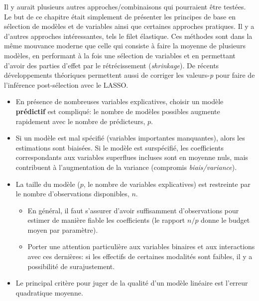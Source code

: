 \documentclass[
  11pt,
  letterpaper,
]{scrbook}
\providecommand{\tightlist}{%
  \setlength{\itemsep}{0pt}\setlength{\parskip}{0pt}}\usepackage{longtable,booktabs,array}
\theoremstyle{definition}
\theoremstyle{remark}
\begin{document}
Il y aurait plusieurs autres approches/combinaisons qui pourraient être
testées. Le but de ce chapitre était simplement de présenter les
principes de base en sélection de modèles et de variables ainsi que
certaines approches pratiques. Il y a d'autres approches intéressantes,
tels le filet élastique. Ces méthodes sont dans la même mouvance moderne
que celle qui consiste à faire la moyenne de plusieurs modèles, en
performant à la fois une sélection de variables et en permettant d'avoir
des parties d'effet par le rétrécissement (\emph{shrinkage}). De récents
développements théoriques permettent aussi de corriger les
valeurs-\emph{p} pour faire de l'inférence post-sélection avec le LASSO.

\begin{tcolorbox}[enhanced jigsaw, coltitle=black, left=2mm, opacitybacktitle=0.6, colback=white, leftrule=.75mm, colframe=quarto-callout-note-color-frame, toprule=.15mm, colbacktitle=quarto-callout-note-color!10!white, opacityback=0, bottomtitle=1mm, toptitle=1mm, rightrule=.15mm, title=\textcolor{quarto-callout-note-color}{\faInfo}\hspace{0.5em}{En résumé}, breakable, titlerule=0mm, arc=.35mm, bottomrule=.15mm]

\begin{itemize}
\tightlist
\item
  En présence de nombreuses variables explicatives, choisir un modèle
  \textbf{prédictif} est compliqué: le nombre de modèles possibles
  augmente rapidement avec le nombre de prédicteurs, \(p\).
\item
  Si un modèle est mal spécifié (variables importantes manquantes),
  alors les estimations sont biaisées. Si le modèle est surspécifié, les
  coefficients correspondants aux variables superflues incluses sont en
  moyenne nuls, mais contribuent à l'augmentation de la variance
  (compromis \emph{biais/variance}).
\item
  La taille du modèle (\(p\), le nombre de variables explicatives) est
  restreinte par le nombre d'observations disponibles, \(n\).

  \begin{itemize}
  \tightlist
  \item
    En général, il faut s'assurer d'avoir suffisamment d'observations
    pour estimer de manière fiable les coefficients (le rapport \(n/p\)
    donne le budget moyen par paramètre).
  \item
    Porter une attention particulière aux variables binaires et aux
    interactions avec ces dernières: si les effectifs de certaines
    modalités sont faibles, il y a possibilité de surajustement.
  \end{itemize}
\item
  Le principal critère pour juger de la qualité d'un modèle linéaire est
  l'erreur quadratique moyenne.


\end{itemize}
\end{tcolorbox}
\end{document}
